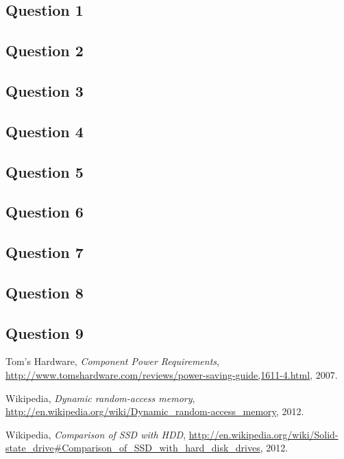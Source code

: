 \documentclass[a4paper,final]{article}
\begin{document}
\subsection*{Question 1}

\subsection*{Question 2}

\subsection*{Question 3}

\subsection*{Question 4}

\subsection*{Question 5}

\subsection*{Question 6}

\subsection*{Question 7}

\subsection*{Question 8}

\subsection*{Question 9}


\begin{thebibliography}{9}
    Tom's Hardware,
    \emph{Component Power Requirements},
    \url{http://www.tomshardware.com/reviews/power-saving-guide,1611-4.html},
    2007.

    Wikipedia,
    \emph{Dynamic random-access memory},
    \url{http://en.wikipedia.org/wiki/Dynamic_random-access_memory},
    2012.

    Wikipedia,
    \emph{Comparison of SSD with HDD},
    \url{http://en.wikipedia.org/wiki/Solid-state_drive#Comparison_of_SSD_with_hard_disk_drives},
    2012.
\end{thebibliography}
\end{document}
